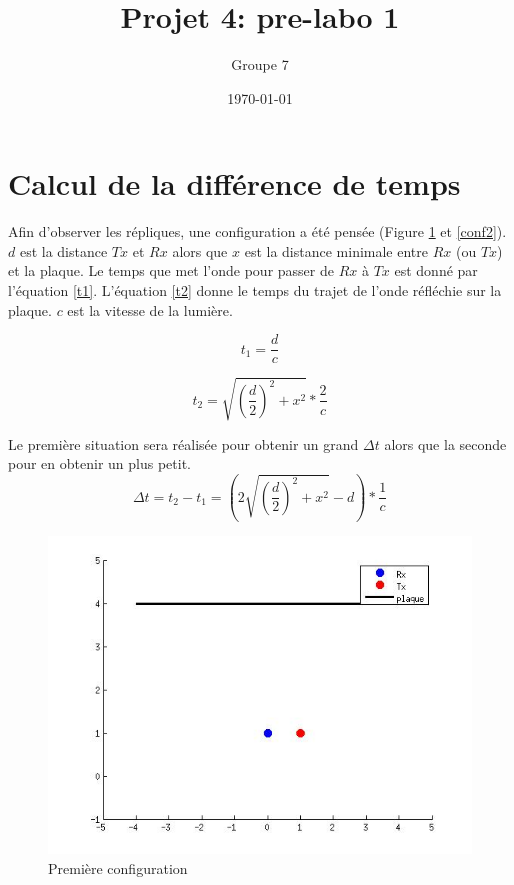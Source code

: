 \documentclass[10pt,a4paper]{article}
\begin{document}
\title{Projet 4: pre-labo 1}
\date\today
\author{Groupe 7}
\maketitle

\section{Calcul de la différence de temps}
	Afin d'observer les répliques, une configuration a été pensée (Figure \ref{conf1} et \ref{conf2}). $d$ est la distance $Tx$ et $Rx$ alors que $x$ est la distance minimale entre $Rx$ (ou $Tx$) et la plaque. Le temps que met l'onde pour passer de $Rx$ à $Tx$ est donné par l'équation \ref{t1}. L'équation \ref{t2} donne le temps du trajet de l'onde réfléchie sur la plaque. $c$ est la vitesse de la lumière. 	

	\begin{equation}
	t_1 = \frac{d}{c}
	\label{t1}
	\end{equation}
	
	\begin{equation}
	t_2 = \sqrt{(\frac{d}{2})^2 + x^2} * \frac{2}{c}
	\label{t2}
	\end{equation}
	
	Le première situation sera réalisée pour obtenir un grand $\Delta t$ alors que la seconde pour en obtenir un plus petit.
	\begin{equation}
	\Delta t = t_2 - t_1 = (2\sqrt{(\frac{d}{2})^2 + x^2} - d ) * \frac{1}{c}
	\end{equation}
	
	\begin{figure}[h]
	\centering
	\includegraphics[scale=0.4]{conf1.jpg}
	\caption{Première configuration \label{conf1} }
	\end{figure}		
	
\end{document}
